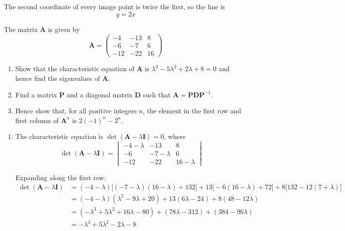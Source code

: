 \documentclass[leqno]{article}
\begin{document}
\begin{enumerate}[
  label=\textbf{\arabic*.},
  leftmargin=*,
  topsep=0pt,
  partopsep=0pt,
  parsep=0pt
]
\begin{djsSolution}
\begin{enumerate}[label=\textbf{(\alph*)}, start=1]
The second coordinate of every image point is twice the first, so the line is
\[
y=2x
\]

\end{enumerate}
\end{djsSolution}

\newpage

\questionitem

The matrix $\mathbf{A}$ is given by
\[\mathbf{A} = \begin{pmatrix} -4 & -13 & 8 \\ -6 & -7 & 6 \\ -12 & -22 & 16 \end{pmatrix}\]
\begin{enumerate}[label=\textbf{(\alph*)}]
  \item Show that the characteristic equation of $\mathbf{A}$ is $\lambda^3 - 5\lambda^2 + 2\lambda + 8 = 0$ and hence find the eigenvalues of $\mathbf{A}$.  \\
  \item Find a matrix $\mathbf{P}$ and a diagonal matrix $\mathbf{D}$ such that $\mathbf{A} = \mathbf{P}\mathbf{D}\mathbf{P}^{-1}$.  \\
  \item Hence show that, for all positive integers $n$, the element in the first row and first column of $\mathbf{A}^n$ is $2(-1)^n - 2^n$.  \\
\end{enumerate}

\vspace*{10pt}

\begin{djsSolution}
\begin{enumerate}[label=\textbf{(\alph*)}, start=1]
  \item The characteristic equation is \(\det(\mathbf{A}-\lambda\mathbf{I})=0\), where
\[
\det(\mathbf{A}-\lambda\mathbf{I})=\begin{vmatrix} -4-\lambda & -13 & 8 \\ -6 & -7-\lambda & 6 \\ -12 & -22 & 16-\lambda \end{vmatrix}
\]

Expanding along the first row:
\begin{align*}
\det(\mathbf{A}-\lambda\mathbf{I}) &= (-4-\lambda)\big[(-7-\lambda)(16-\lambda)+132\big]+13\big[-6(16-\lambda)+72\big]+8\big[132-12(7+\lambda)\big]\\
&= (-4-\lambda)(\lambda^2-9\lambda+20)+13(6\lambda-24)+8(48-12\lambda)\\
&= (-\lambda^3+5\lambda^2+16\lambda-80)+(78\lambda-312)+(384-96\lambda)\\
&= -\lambda^3+5\lambda^2-2\lambda-8
\end{align*}


\end{enumerate}
\end{djsSolution}
\end{enumerate}
\end{document}

